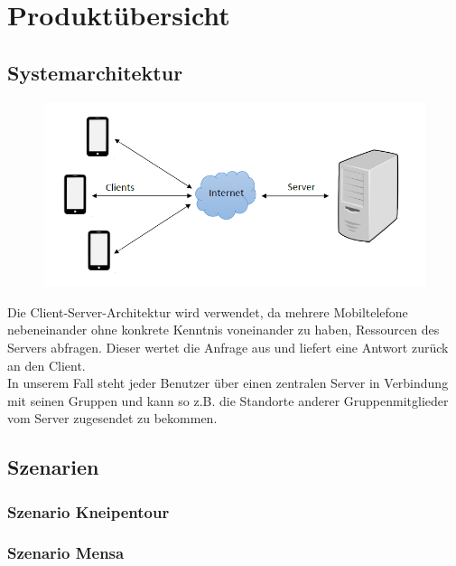 \section{Produktübersicht}


\subsection{Systemarchitektur}

\begin{figure} [H]
	\centering
	\includegraphics[scale = 0.8]{res/clientServerArchitektur.png}
\end{figure}
Die Client-Server-Architektur wird verwendet, da mehrere Mobiltelefone nebeneinander ohne konkrete Kenntnis voneinander zu haben, Ressourcen des Servers abfragen. Dieser wertet die Anfrage aus und liefert eine Antwort zurück an den Client. \\
In unserem Fall steht jeder Benutzer über einen zentralen Server in Verbindung mit seinen Gruppen und kann so z.B. die Standorte anderer Gruppenmitglieder vom Server zugesendet zu bekommen.

\subsection{Szenarien}
\subsubsection{Szenario Kneipentour}

\subsubsection{Szenario Mensa}

